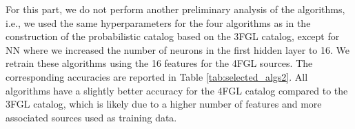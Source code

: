 For this part, we do not perform another preliminary analysis of the algorithms, i.e., we used the same hyperparameters for the four algorithms as in the construction of the probabilistic catalog based on the 3FGL catalog, except for NN where we increased the number of neurons in the first hidden layer to 16.
We retrain these algorithms using the 16 features for the 4FGL sources.
The corresponding accuracies are reported in Table \ref{tab:selected_algs2}.
All algorithms have a slightly better accuracy for the 4FGL catalog compared to the 3FGL catalog, which is likely due to a higher number of features and more associated sources used as training data. 


